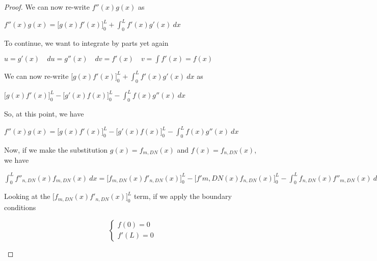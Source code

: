 \documentclass[executivepaper]{article}
\begin{document}
\begin{flushleft}
\begin{proof}
We can now re-write $f''(x)g(x)$ as

\begin{center}

$f''(x)g(x)=\bigg[g(x)f'(x)\bigg]_{0}^{L} + \int_{0}^{L} f'(x)g'(x) \ dx$

\end{center}

To continue, we want to integrate by parts yet again

\begin{center}

$u=g'(x) \quad du=g''(x) \quad dv=f'(x) \quad v=\int f'(x)=f(x)$

\end{center}

We can now re-write $\bigg[g(x)f'(x)\bigg]_{0}^{L} + \int_{0}^{L} f'(x)g'(x) \ dx$ as

\begin{center}

$\bigg[g(x)f'(x)\bigg]_{0}^{L} - \bigg[g'(x)f(x)\bigg]_{0}^{L} - \int_{0}^{L} f(x)g''(x) \ dx$

\end{center}

So, at this point, we have

\begin{center}

$f''(x)g(x)=\bigg[g(x)f'(x)\bigg]_{0}^{L} - \bigg[g'(x)f(x)\bigg]_{0}^{L} - \int_{0}^{L} f(x)g''(x) \ dx$

\end{center}

Now, if we make the substitution $g(x)=f_{m,DN}(x)$ and $f(x)=f_{n,DN}(x)$, we have

\begin{center}

$\int_{0}^{L} f''_{n, DN}(x)f_{m, DN}(x) \ dx=\bigg[f_{m, DN}(x)f'_{n, DN}(x)\bigg]_{0}^{L} - \bigg[f'{m, DN}(x)f_{n, DN}(x)\bigg]_{0}^{L} - \int_{0}^{L} f_{n, DN}(x)f''_{m, DN}(x) \ dx$

\end{center}

Looking at the $\bigg[f_{m, DN}(x)f'_{n, DN}(x)\bigg]_{0}^{L}$ term, if we apply the boundary conditions

\begin{center}

\[ \begin{cases} 
      f(0)=0 \\
      f'(L)=0
   \end{cases}
\]


\end{center}
\end{proof}
\end{flushleft}
\end{document}
